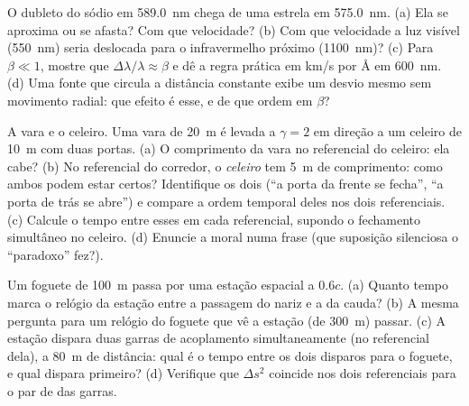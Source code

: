 \begin{exercise}[$\star\star$]\label{exo:b3:relativistic-kinematics:7}
O dubleto do sódio em \qty{589.0}{nm} chega de uma estrela em
\qty{575.0}{nm}. (a) Ela se aproxima ou se afasta? Com que velocidade?
(b) Com que velocidade a luz visível (\qty{550}{nm}) seria deslocada
para o infravermelho próximo (\qty{1100}{nm})? (c) Para $\beta \ll 1$,
mostre que $\Delta\lambda/\lambda \approx \beta$ e dê a regra prática
em km/s por \unit{\angstrom} em \qty{600}{nm}. (d) Uma fonte que
circula a distância constante exibe um desvio mesmo sem movimento
radial: que efeito é esse, e de que ordem em $\beta$?
\end{exercise}

\begin{exercise}[$\star\star$]\label{exo:b3:relativistic-kinematics:8}
A vara e o celeiro. Uma vara de \qty{20}{m} é levada a $\gamma = 2$ em
direção a um celeiro de \qty{10}{m} com duas portas. (a) O comprimento
da vara no referencial do celeiro: ela cabe? (b) No referencial do
corredor, o \emph{celeiro} tem \qty{5}{m} de comprimento: como ambos
podem estar certos? Identifique os dois  (``a porta da frente
se fecha'', ``a porta de trás se abre'') e compare a ordem temporal
deles nos dois referenciais. (c) Calcule o tempo entre esses  em
cada referencial, supondo o fechamento simultâneo no celeiro. (d)
Enuncie a moral numa frase (que suposição silenciosa o ``paradoxo''
fez?).
\end{exercise}

\begin{exercise}[$\star\star$]\label{exo:b3:relativistic-kinematics:9}
Um foguete de  \qty{100}{m} passa por uma estação
espacial a $0.6c$. (a) Quanto tempo marca o relógio da estação entre a
passagem do nariz e a da cauda? (b) A mesma pergunta para um relógio do
foguete que vê a estação (de  \qty{300}{m}) passar.
(c) A estação dispara duas garras de acoplamento simultaneamente (no
referencial dela), a \qty{80}{m} de distância: qual é o tempo entre os
dois disparos para o foguete, e qual dispara primeiro? (d) Verifique
que $\Delta s^2$ coincide nos dois referenciais para o par de 
das garras.
\end{exercise}

